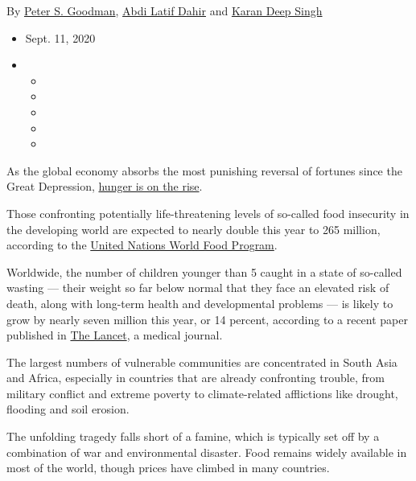 By \href{https://www.nytimes3xbfgragh.onion/by/peter-s-goodman}{Peter S.
Goodman},
\href{https://www.nytimes3xbfgragh.onion/by/abdi-latif-dahir}{Abdi Latif
Dahir} and
\href{https://www.nytimes3xbfgragh.onion/by/karan-deep-singh}{Karan Deep
Singh}

\begin{itemize}
\item
  Sept. 11, 2020
\item
  \begin{itemize}
  \item
  \item
  \item
  \item
  \item
  \end{itemize}
\end{itemize}

As the global economy absorbs the most punishing reversal of fortunes
since the Great Depression,
\href{https://www.nytimes3xbfgragh.onion/2020/09/11/business/covid-hunger-food-insecurity.html}{hunger
is on the rise}.

Those confronting potentially life-threatening levels of so-called food
insecurity in the developing world are expected to nearly double this
year to 265 million, according to the
\href{https://www.wfp.org/news/covid-19-will-double-number-people-facing-food-crises-unless-swift-action-taken}{United
Nations World Food Program}.

Worldwide, the number of children younger than 5 caught in a state of
so-called wasting --- their weight so far below normal that they face an
elevated risk of death, along with long-term health and developmental
problems --- is likely to grow by nearly seven million this year, or 14
percent, according to a recent paper published in
\href{https://www.thelancet.com/journals/lancet/article/PIIS0140-6736(20)31647-0/fulltext}{The
Lancet}, a medical journal.

The largest numbers of vulnerable communities are concentrated in South
Asia and Africa, especially in countries that are already confronting
trouble, from military conflict and extreme poverty to climate-related
afflictions like drought, flooding and soil erosion.

The unfolding tragedy falls short of a famine, which is typically set
off by a combination of war and environmental disaster. Food remains
widely available in most of the world, though prices have climbed in
many countries.

